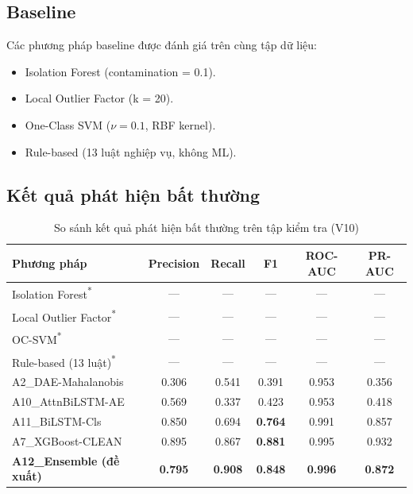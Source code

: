 \subsection{Baseline}

Các phương pháp baseline được đánh giá trên cùng tập dữ liệu:
\begin{itemize}
  \item Isolation Forest (contamination = 0.1).
  \item Local Outlier Factor (k = 20).
  \item One-Class SVM ($\nu = 0.1$, RBF kernel).
  \item Rule-based (13 luật nghiệp vụ, không ML).
\end{itemize}

\subsection{Kết quả phát hiện bất thường}

\begin{table}[h!]
\centering
\fontsize{12pt}{14pt}\selectfont
\caption{So sánh kết quả phát hiện bất thường trên tập kiểm tra (V10)}
\label{tab:ket_qua_ad}
\begin{tabularx}{\textwidth}{|>{\raggedright\arraybackslash}X|c|c|c|c|c|}
\hline
\textbf{Phương pháp} & \textbf{Precision} & \textbf{Recall} & \textbf{F1} & \textbf{ROC-AUC} & \textbf{PR-AUC} \\
\hline
Isolation Forest\textsuperscript{*} & --- & --- & --- & --- & --- \\
\hline
Local Outlier Factor\textsuperscript{*} & --- & --- & --- & --- & --- \\
\hline
OC-SVM\textsuperscript{*} & --- & --- & --- & --- & --- \\
\hline
Rule-based (13 luật)\textsuperscript{*} & --- & --- & --- & --- & --- \\
\hline
A2\_DAE-Mahalanobis & 0.306 & 0.541 & 0.391 & 0.953 & 0.356 \\
\hline
A10\_AttnBiLSTM-AE & 0.569 & 0.337 & 0.423 & 0.953 & 0.418 \\
\hline
A11\_BiLSTM-Cls & 0.850 & 0.694 & \textbf{0.764} & 0.991 & 0.857 \\
\hline
A7\_XGBoost-CLEAN & 0.895 & 0.867 & \textbf{0.881} & 0.995 & 0.932 \\
\hline
\textbf{A12\_Ensemble (đề xuất)} & \textbf{0.795} & \textbf{0.908} & \textbf{0.848} & \textbf{0.996} & \textbf{0.872} \\
\hline
\end{tabularx}
\end{table}

